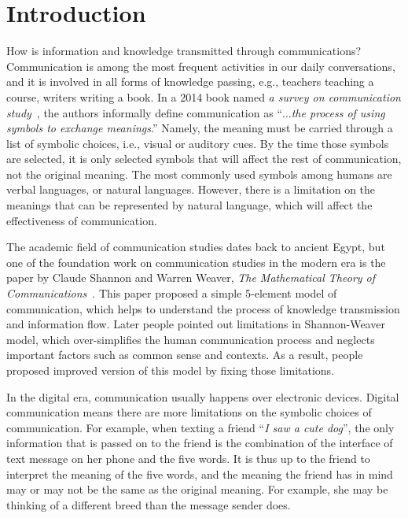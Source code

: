 
\chapter{Introduction}

How is information and knowledge transmitted through communications? Communication is among the most frequent activities in our daily conversations, and it is involved in all forms of knowledge passing, e.g., teachers teaching a course, writers writing a book. In a 2014 book named \textit{a survey on communication study}~\cite{hahn2014survey}, the authors informally define communication as ``$\ldots$\textit{the process of using symbols to exchange meanings}.'' Namely, the meaning must be carried through a list of symbolic choices, i.e., visual or auditory cues. By the time those symbols are selected, it is only selected symbols that will affect the rest of communication, not the original meaning. The most commonly used symbols among humans are verbal languages, or natural languages. However, there is a limitation on the meanings that can be represented by natural language, which will affect the effectiveness of communication. 

The academic field of communication studies dates back to ancient Egypt, but one of the foundation work on communication studies in the modern era is the paper by Claude Shannon and Warren Weaver, \textit{The Mathematical Theory of Communications}~\cite{shannon1951mathematical}. This paper proposed a simple 5-element model of communication, which helps to understand the process of knowledge transmission and information flow. Later people pointed out limitations in Shannon-Weaver model, which over-simplifies the human communication process and neglects important factors such as common sense and contexts. As a result, people proposed improved version of this model by fixing those limitations. 

In the digital era, communication usually happens over electronic devices. Digital communication means there are more limitations on the symbolic choices of communication. For example, when texting a friend ``\textit{I saw a cute dog}'', the only information that is passed on to the friend is the combination of the interface of text message on her phone and the five words. It is thus up to the friend to interpret the meaning of the five words, and the meaning the friend has in mind may or may not be the same as the original meaning. For example, she may be thinking of a different breed than the message sender does. 

